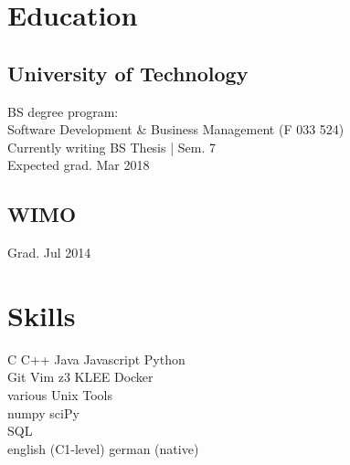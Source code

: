 \documentclass[]{resume}
\begin{document}
	
\lastupdated




\vfill
\begin{minipage}[t]{0.33\textwidth} 
\section{Education} 
	\subsection{University of Technology}
		BS degree program: \\
		Software Development \& Business Management (F 033 524)\\
		Currently writing BS Thesis | Sem. 7 \\
		Expected grad. Mar 2018
	\sectionsep

	\subsection{WIMO}
		Grad. Jul 2014
	\sectionsep

\section{Skills}
	C \textbullet{} C++ \textbullet{} Java \textbullet{} Javascript \textbullet{} Python \\ \sectionsep 
	Git \textbullet{} Vim \textbullet{} z3 \textbullet{} KLEE \textbullet{} Docker\\ 
	various Unix Tools \\ \sectionsep 
	numpy \textbullet{} sciPy \\ \sectionsep 
	SQL\\ \sectionsep 
	english (C1-level) \textbullet{} german (native)
	
\end{minipage}\quad %
\end{document}
